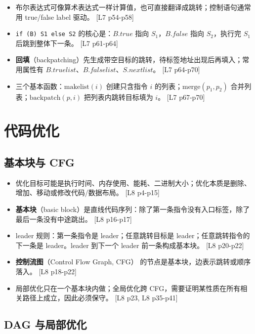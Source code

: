 \documentclass[UTF8,fontset=none,11pt]{ctexart}
\newcommand{\pg}[1]{{\scriptsize\textcolor{citegray}{[#1]}}}
\newcommand{\term}[2]{\textbf{#1}（#2）}
\newcommand{\code}[1]{\texttt{#1}}
\begin{document}
\begin{itemize}
  \item 布尔表达式可像算术表达式一样计算值，也可直接翻译成跳转；控制语句通常用 true/false label 驱动。 \pg{L7 p54-p58}
  \item \code{if (B) S1 else S2} 的核心是：\(B.true\) 指向 \(S_1\)，\(B.false\) 指向 \(S_2\)，执行完 \(S_1\) 后跳到整体下一条。 \pg{L7 p61-p64}
  \item \term{回填}{backpatching}先生成带空目标的跳转，待标签地址出现后再填入；常用属性有 \(B.truelist\)、\(B.falselist\)、\(S.nextlist\)。 \pg{L7 p64-p70}
  \item 三个基本函数：\(\text{makelist}(i)\) 创建只含指令 \(i\) 的列表；\(\text{merge}(p_1,p_2)\) 合并列表；\(\text{backpatch}(p,i)\) 把列表内跳转目标填为 \(i\)。 \pg{L7 p67-p70}
\end{itemize}

\section{代码优化}

\subsection{基本块与 CFG}

\begin{itemize}
  \item 优化目标可能是执行时间、内存使用、能耗、二进制大小；优化本质是删除、增加、移动或修改代码/数据布局。 \pg{L8 p4-p15}
  \item \term{基本块}{basic block}是直线代码序列：除了第一条指令没有入口标签，除了最后一条没有中途跳出。 \pg{L8 p16-p17}
  \item leader 规则：第一条指令是 leader；任意跳转目标是 leader；任意跳转指令的下一条是 leader。leader 到下一个 leader 前一条构成基本块。 \pg{L8 p20-p22}
  \item \term{控制流图}{Control Flow Graph, CFG} 的节点是基本块，边表示跳转或顺序落入。 \pg{L8 p18-p22}
  \item 局部优化只在一个基本块内做；全局优化跨 CFG，需要证明某性质在所有相关路径上成立，因此必须保守。 \pg{L8 p23, L8 p35-p41}
\end{itemize}

\subsection{DAG 与局部优化}
\end{document}
